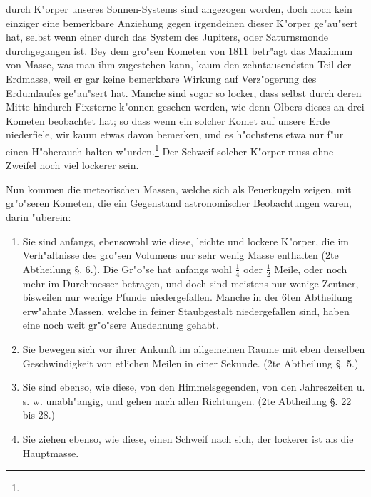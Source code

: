 \documentclass[a4paper, 11pt, oneside, polutonikogreek, german]{article}
\begin{document}
durch K"orper unseres Sonnen-Systems sind angezogen worden, doch noch kein einziger eine bemerkbare Anziehung gegen irgendeinen dieser K"orper ge"au"sert hat, selbst wenn einer durch das System des Jupiters, oder Saturnsmonde durchgegangen ist. Bey dem gro"sen Kometen von 1811 betr"agt das Maximum von Masse, was man ihm zugestehen kann, kaum den zehntausendsten Teil der Erdmasse, weil er gar keine bemerkbare Wirkung auf Verz"ogerung des Erdumlaufes ge"au"sert hat. Manche sind sogar so locker, dass selbst durch deren Mitte hindurch Fixsterne k"onnen gesehen werden, wie denn Olbers dieses an drei Kometen beobachtet hat; so dass wenn ein solcher Komet auf unsere Erde niederfiele, wir kaum etwas davon bemerken, und es h"ochstens etwa nur f"ur einen H"oherauch halten w"urden.\footnote{} Der Schweif solcher K"orper muss ohne Zweifel noch viel lockerer sein.

Nun kommen die meteorischen Massen, welche sich als Feuerkugeln zeigen, mit gr"o"seren Kometen, die ein Gegenstand astronomischer Beobachtungen waren, darin "uberein:
\begin{enumerate}
    \item Sie sind anfangs, ebensowohl wie diese, leichte und lockere K"orper, die im Verh"altnisse des gro"sen Volumens nur sehr wenig Masse enthalten (2te Abtheilung §. 6.). Die Gr"o"se hat anfangs wohl $\mathfrak{\frac{1}{4}}$ oder $\mathfrak{\frac{1}{2}}$ Meile, oder noch mehr im Durchmesser betragen, und doch sind meistens nur wenige Zentner, bisweilen nur wenige Pfunde niedergefallen. Manche in der 6ten Abtheilung erw"ahnte Massen, welche in feiner Staubgestalt niedergefallen sind, haben eine noch weit gr"o"sere Ausdehnung gehabt.
    \item Sie bewegen sich vor ihrer Ankunft im allgemeinen Raume mit eben derselben Geschwindigkeit von etlichen Meilen in einer Sekunde. (2te Abtheilung §. 5.)
    \item Sie sind ebenso, wie diese, von den Himmelsgegenden, von den Jahreszeiten u. s. w. unabh"angig, und gehen nach allen Richtungen. (2te Abtheilung §. 22 bis 28.)
    \item Sie ziehen ebenso, wie diese, einen Schweif nach sich, der lockerer ist als die Hauptmasse.
\end{enumerate}
\end{document}

